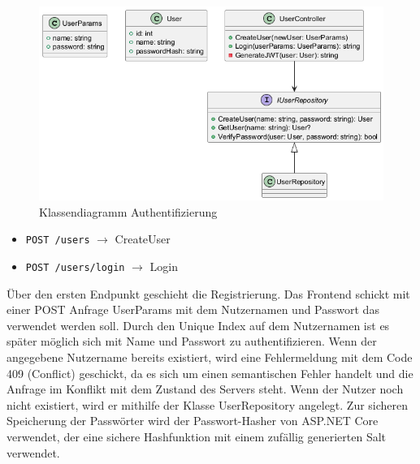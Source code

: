 \begin{figure}[htb]
    \includegraphics[width=\linewidth]{images/diagrams/auth.png}
    \caption{Klassendiagramm Authentifizierung}
    \label{fig:cd_auth}
\end{figure}

\begin{itemize}
    \item \lstinline{POST /users} $\rightarrow$ CreateUser
    \item \lstinline{POST /users/login} $\rightarrow$ Login
\end{itemize}

Über den ersten Endpunkt geschieht die Registrierung. Das Frontend schickt mit einer POST Anfrage UserParams mit dem Nutzernamen und Passwort das verwendet werden soll. Durch den Unique Index auf dem Nutzernamen ist es später möglich sich mit Name und Passwort zu authentifizieren.
Wenn der angegebene Nutzername bereits existiert, wird eine Fehlermeldung mit dem Code 409 (Conflict) geschickt, da es sich um einen semantischen Fehler handelt und die Anfrage im Konflikt mit dem Zustand des Servers steht. %
Wenn der Nutzer noch nicht existiert, wird er mithilfe der Klasse UserRepository angelegt.
Zur sicheren Speicherung der Passwörter wird der Passwort-Hasher von ASP.NET Core verwendet, der eine sichere Hashfunktion mit einem zufällig generierten Salt verwendet.

